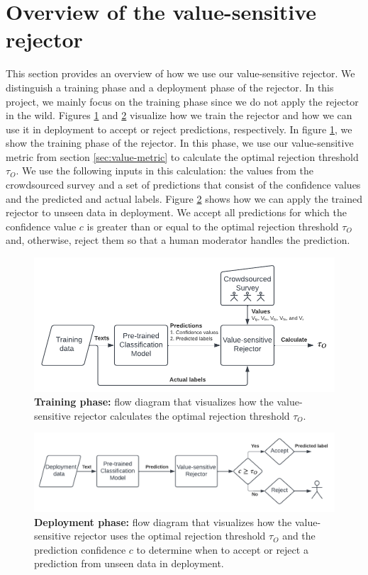\section{Overview of the value-sensitive rejector}
\label{sec:overview-rejector}
This section provides an overview of how we use our value-sensitive rejector.
%
We distinguish a training phase and a deployment phase of the rejector.
%
In this project, we mainly focus on the training phase since we do not apply the rejector in the wild.
%
Figures \ref{fig:training} and \ref{fig:deployment} visualize how we train the rejector and how we can use it in deployment to accept or reject predictions, respectively.
%
In figure \ref{fig:training}, we show the training phase of the rejector.
%
In this phase, we use our value-sensitive metric from section \ref{sec:value-metric} to calculate the optimal rejection threshold $\tau_O$.
%
We use the following inputs in this calculation: the values from the crowdsourced survey and a set of predictions that consist of the confidence values and the predicted and actual labels.
%
Figure \ref{fig:deployment} shows how we can apply the trained rejector to unseen data in deployment.
%
We accept all predictions for which the confidence value $c$ is greater than or equal to the optimal rejection threshold $\tau_O$ and, otherwise, reject them so that a human moderator handles the prediction.
%
\begin{figure}
    \centering
    \includegraphics[scale=.75]{Figures/training.pdf}
    \caption{\textbf{Training phase:} flow diagram that visualizes how the value-sensitive rejector calculates the optimal rejection threshold $\tau_O$.}
    \label{fig:training}
\end{figure}
%
\begin{figure}
    \centering
    \includegraphics[scale=.75]{Figures/deployment.pdf}
    \caption{\textbf{Deployment phase:} flow diagram that visualizes how the value-sensitive rejector uses the optimal rejection threshold $\tau_O$ and the prediction confidence $c$ to determine when to accept or reject a prediction from unseen data in deployment.}
    \label{fig:deployment}
\end{figure}

